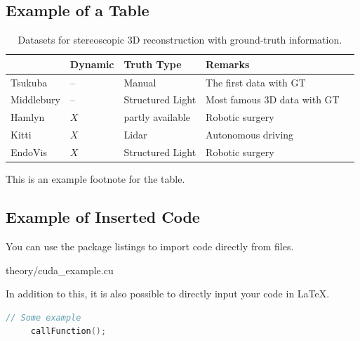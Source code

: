 \documentclass[class=scrbook, crop=false]{standalone}
\begin{document}
    \subsection{Example of a Table}
    \begin{table}[ht]
        \centering
        \caption[Datasets for 3D reconstruction]{Datasets for stereoscopic 3D reconstruction with ground-truth information.}
        \label{Table::Dataset_attributes}
        \begin{tabular}{|l|l|l|l|l|}
            \hline
            ~                        & Dynamic & Truth Type       & Remarks\\
            \hline
            \color{blue} Tsukuba      & --      & Manual           & The first data with GT\\
            \color{orange} Middlebury & --      & Structured Light & Most famous 3D data with GT \\
            \color{red} Hamlyn        & $X$     & partly available & Robotic surgery\\
            \color{cyan} Kitti        & $X$     & Lidar            & Autonomous driving\\
            \color{green} EndoVis     & $X$     & Structured Light & Robotic surgery\\
            \hline
        \end{tabular}
        \begin{tablenotes}
            \small
            \item * This is an example footnote for the table.
        \end{tablenotes}
    \end{table}

    \subsection{Example of Inserted Code}
    \label{Section::Insert_Code}
    You can use the package listings to import code directly from files. 
    
    {theory/cuda_example.cu}

    In addition to this, it is also possible to directly input your code in \LaTeX.
    \begin{lstlisting}[language=C++,
                       caption=Another Descriptive Caption Text,
                       label=Code:Super Code2]
     // Some example
     callFunction();
    \end{lstlisting}
\end{document}
